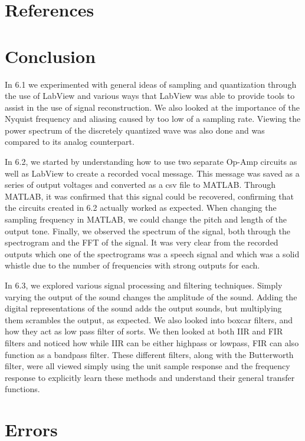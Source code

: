 \documentclass[10pt]{article}
\begin{document}
\medskip


\section{References}

\medskip

\section{Conclusion}

In 6.1 we experimented with general ideas of sampling and quantization through the use of LabView and various ways that LabView was able to provide tools to assist in the use of signal reconstruction. We also looked at the importance of the Nyquist frequency and aliasing caused by too low of a sampling rate. Viewing the power spectrum of the discretely quantized wave was also done and was compared to its analog counterpart.

In 6.2, we started by understanding how to use two separate Op-Amp circuits as well as LabView to create a recorded vocal message. This message was saved as a series of output voltages and converted as a csv file to MATLAB. Through MATLAB, it was confirmed that this signal could be recovered, confirming that the circuits created in 6.2 actually worked as expected. When changing the sampling frequency in MATLAB, we could change the pitch and length of the output tone. Finally, we observed the spectrum of the signal, both through the spectrogram and the FFT of the signal. It was very clear from the recorded outputs which one of the spectrograms was a speech signal and which was a solid whistle due to the number of frequencies with strong outputs for each. 

In 6.3, we explored various signal processing and filtering techniques. Simply varying the output of the sound changes the amplitude of the sound. Adding the digital representations of the sound adds the output sounds, but multiplying them scrambles the output, as expected. We also looked into boxcar filters, and how they act as low pass filter of sorts. We then looked at both IIR and FIR filters and noticed how while IIR can be either highpass or lowpass, FIR can also function as a bandpass filter. These different filters, along with the Butterworth filter, were all viewed simply using the unit sample response and the  frequency response to explicitly learn these methods and understand their general transfer functions. 

\medskip


\section{Errors}
 
\end{document}
